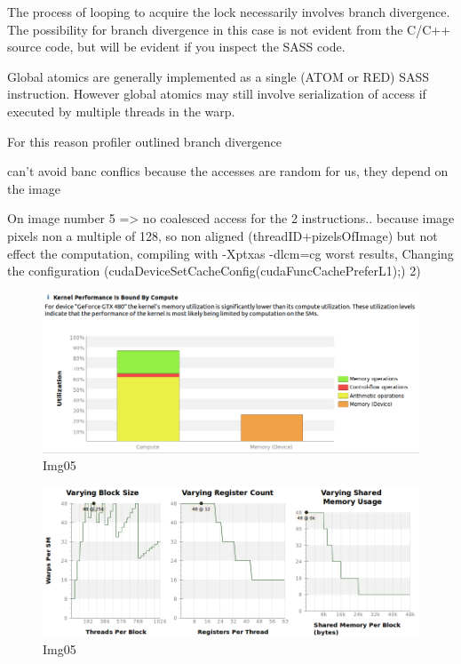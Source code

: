 \documentclass[a4paper]{article}
\begin{document}
The process of looping to acquire the lock necessarily involves branch divergence. The possibility for branch divergence in this case is not evident from the C/C++ source code, but will be evident if you inspect the SASS code.

Global atomics are generally implemented as a single (ATOM or RED) SASS instruction. However global atomics may still involve serialization of access if executed by multiple threads in the warp. 

For this reason profiler outlined branch divergence

can't avoid banc conflics because the accesses are random for us, they depend on the image


On image number 5 => no coalesced access for the 2 instructions.. because image pixels non a multiple of 128, so non aligned (threadID+pizelsOfImage) but not effect the computation, compiling with -Xptxas -dlcm=cg worst results, Changing the configuration (cudaDeviceSetCacheConfig(cudaFuncCachePreferL1);)
2) 





\begin{figure}[!ht]
    \centering
    \includegraphics[width=0.7\linewidth]{profiling/darker/darker_utilization_00}
    \caption{Img05}
    \label{fig:du}
\end{figure}
\FloatBarrier

\begin{figure}[!ht]
    \centering
    \includegraphics[width=0.7\linewidth]{profiling/darker/darker_varying}
    \caption{Img05}
    \label{fig:dv}
\end{figure}
\FloatBarrier
\end{document}

